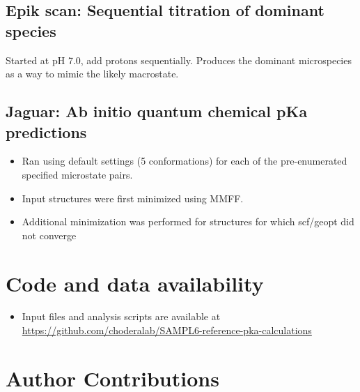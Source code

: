 \documentclass[9pt,lineno,final]{elife}
\begin{document}
\subsection{Epik scan: Sequential titration of dominant species} 


Started at pH 7.0, add protons sequentially. 
%
Produces the dominant microspecies as a way to mimic the likely macrostate.
%


\subsection{Jaguar: Ab initio quantum chemical pKa predictions}
\begin{itemize}
	\item Ran using default settings (5 conformations) for each of the pre-enumerated specified microstate pairs.
	\item Input structures were first minimized using MMFF.
	\item Additional minimization was performed for structures for which scf/geopt did not converge
\end{itemize}





\section{Code and data availability}

\begin{itemize}
	\item Input files and analysis scripts are available at \href{https://github.com/choderalab/SAMPL6-reference-pka-calculations}{https://github.com/choderalab/SAMPL6-reference-pka-calculations}
\end{itemize}

\section{Author Contributions}

\end{document}
